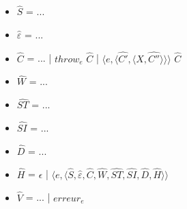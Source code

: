 \documentclass[10pt,a4paper]{article}
\begin{document}
				\begin{itemize}
					\item[] $\widehat{S}$ = ... 
					\item[] $\widehat{\varepsilon}$ = ... 
					\item[] $\widehat{C}$ = ... |  $throw_{e} $ $\widehat{C}$ | $\langle e,\langle\widehat{C'},\langle X,\widehat{C''}\rangle\rangle\rangle$ $\widehat{C}$ 
					\item[] $\widehat{W}$ = ...
					\item[] $\widehat{ST}$ = ...
					\item[] $\widehat{SI}$ = ...
					\item[] $\widehat{D}$ = ...
					\item[] $\widehat{H}$ = $\epsilon$ | $\langle e,\langle\widehat{S},\widehat{\varepsilon},\widehat{C},\widehat{W},\widehat{ST},\widehat{SI},\widehat{D},\widehat{H}\rangle\rangle$ 
					\item[] $\widehat{V}$ = ... | $erreur_{e}$
				\end{itemize}
				\bigbreak
				
\end{document}
